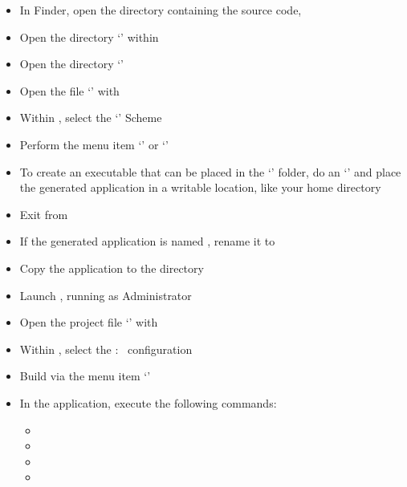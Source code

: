 \begin{itemize}
\item In Finder, open the directory containing the \mplusm{} source code,
\item\exSp{}Open the directory `' within
\item\exSp{}Open the directory `'
\item\exSp{}Open the file `' with 
\item\exSp{}Within , select the `' Scheme
\item\exSp{}Perform the menu item `' or
`'
\item\exSp{}To create an executable that can be placed in the `'
folder, do an `'
and place the generated application in a writable location, like your home directory
\item\exSp{}Exit from 
\item\exSp{}If the generated application is named , rename
it to 
\item\exSp{}Copy the  application to the 
directory
\end{itemize}
\tertiaryEnd
{}
\begin{itemize}
\item Launch , running as Administrator
\item\exSp{}Open the project file
`' with
\item\exSp{}Within , select the  :\ 
configuration
\item\exSp{}Build via the menu item `'
\end{itemize}
\tertiaryEnd
{}
\begin{itemize}
\item In the  application, execute the following commands:
\begin{itemize}
\item {}
\item\exSp{}
\item\exSp{}
\item\exSp{}
\end{itemize}
\end{itemize}
